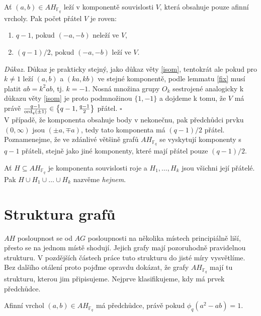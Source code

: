 \documentclass[12pt]{report}
\begin{document}
\begin{veta}\label{lol}
Ať $(a,b) \in AH_{\mathbb{F}_q}$ leží v komponentě souvislosti $V$, která obsahuje pouze afinní vrcholy. Pak počet přátel $V$ je roven:
\begin{enumerate}
\item $q-1$, pokud $(-a,-b)$ neleží ve $V$,
\item $(q-1)/2$, pokud $(-a,-b)$ leží ve $V$.
\end{enumerate} 
\end{veta}
\noindent \textit{Důkaz.} Důkaz je prakticky stejný, jako důkaz věty \ref{isom}, tentokrát ale pokud pro $k \neq 1$ leží $(a,b)$ a $(ka,kb)$ ve stejné komponentě, podle lemmatu \ref{fix} musí platit $a b = k^2 ab$, tj. $k = - 1$. Nosná množina grupy $O_{k}$ sestrojené analogicky k důkazu věty \ref{isom} je proto podmnožinou $\lbrace 1,-1 \rbrace$ a dojdeme k tomu, že  $V$ má právě $\frac{q-1}{\operatorname{ord}_q (\pm 1)} \in  \left\lbrace q-1,\frac{q-1}{2}\right\rbrace$ přátel. \hfill $\square$\\

V případě, že komponenta obsahuje body v nekonečnu, pak předchůdci prvku $(0,\infty)$ jsou $(\pm a,\mp a)$, tedy tato komponenta má $(q-1)/2$ přátel. Poznamenejme, že ve zdánlivé většině grafů $AH_{\mathbb{F}_q}$ se vyskytují komponenty s $q-1$ přáteli, stejně jako jiné komponenty, které mají přátel pouze $(q-1)/2$.

\begin{definice}
Ať $H \subseteq AH_{\mathbb{F}_q}$ je komponenta souvislosti roje a $H_1,\dots,H_k$ jsou všichni její přátelé. Pak $H \cup H_1 \cup \dots \cup H_k$ nazvěme \textit{hejnem}.
\end{definice}
 

\section{Struktura grafů}

$AH$ posloupnost se od $AG$ posloupnosti na několika místech principiálně liší, přesto se na jednom místě shodují. Jejich grafy mají pozoruhodně pravidelnou strukturu. V pozdějších částech práce tuto strukturu do jisté míry vysvětlíme. Bez dalšího otálení proto pojďme opravdu dokázat, že grafy $AH_{\mathbb{F}_q}$ mají tu strukturu, kterou jim připisujeme. Nejprve klasifikujeme, kdy má prvek předchůdce.

\begin{lemma}\label{lema}
Afinní vrchol $(a,b) \in AH_{\mathbb{F}_q}$ má předchůdce, právě pokud $\phi_q(a^2-ab)=1$.
\end{lemma}
\end{document}
